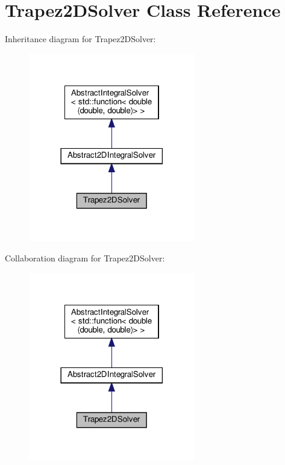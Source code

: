 \hypertarget{class_trapez2_d_solver}{}\section{Trapez2\+D\+Solver Class Reference}
\label{class_trapez2_d_solver}


Inheritance diagram for Trapez2\+D\+Solver\+:
\nopagebreak
\begin{figure}[H]
\begin{center}
\leavevmode
\includegraphics[width=206pt]{class_trapez2_d_solver__inherit__graph}
\end{center}
\end{figure}


Collaboration diagram for Trapez2\+D\+Solver\+:
\nopagebreak
\begin{figure}[H]
\begin{center}
\leavevmode
\includegraphics[width=206pt]{class_trapez2_d_solver__coll__graph}
\end{center}
\end{figure}
